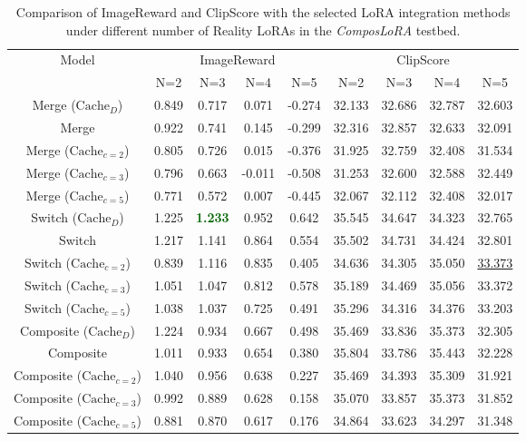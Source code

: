 \begin{table}[H]
\caption{Comparison of ImageReward and ClipScore with the selected LoRA integration methods under different number of Reality LoRAs in the \textit{ComposLoRA} testbed.}
\label{realityirclipfull}
\begin{center}
\begin{tabular}{c|cccc|cccc}
\toprule
\multirow{2}{*}{Model} & \multicolumn{4}{c|}{ImageReward} & \multicolumn{4}{c}{ClipScore} \\
\cmidrule(lr){2-5} \cmidrule(lr){6-9}
& N=2 & N=3 & N=4 & N=5 & N=2 & N=3 & N=4 & N=5 \\
\midrule
Merge ($\text{Cache}_{D}$) & 0.849 & 0.717 & 0.071 & -0.274 & 32.133 & 32.686 & 32.787 & 32.603 \\
Merge & 0.922 & 0.741 & 0.145 & -0.299 & 32.316 & 32.857 & 32.633 & 32.091 \\
Merge ($\text{Cache}_{c=2}$) & 0.805 & 0.726 & 0.015 & -0.376 & 31.925 & 32.759 & 32.408 & 31.534 \\
Merge ($\text{Cache}_{c=3}$) & 0.796 & 0.663 & -0.011 & -0.508 & 31.253 & 32.600 & 32.588 & 32.449 \\
Merge ($\text{Cache}_{c=5}$) & 0.771 & 0.572 & 0.007 & -0.445 & 32.067 & 32.112 & 32.408 & 32.017 \\

Switch ($\text{Cache}_{D}$) & 1.225 & \textcolor{darkgreen}{\textbf{1.233}} & 0.952 & 0.642 & 35.545 & 34.647 & 34.323 & 32.765 \\
Switch & 1.217 & 1.141 & 0.864 & 0.554 & 35.502 & 34.731 & 34.424 & 32.801 \\
Switch ($\text{Cache}_{c=2}$) & 0.839 & 1.116 & 0.835 & 0.405 & 34.636 & 34.305 & 35.050 & \underline{33.373} \\
Switch ($\text{Cache}_{c=3}$) & 1.051 & 1.047 & 0.812 & 0.578 & 35.189 & 34.469 & 35.056 & 33.372 \\
Switch ($\text{Cache}_{c=5}$) & 1.038 & 1.037 & 0.725 & 0.491 & 35.296 & 34.316 & 34.376 & 33.203 \\

Composite ($\text{Cache}_{D}$) & 1.224 & 0.934 & 0.667 & 0.498 & 35.469 & 33.836 & 35.373 & 32.305 \\
Composite & 1.011 & 0.933 & 0.654 & 0.380 & 35.804 & 33.786 & 35.443 & 32.228 \\
Composite ($\text{Cache}_{c=2}$) & 1.040 & 0.956 & 0.638 & 0.227 & 35.469 & 34.393 & 35.309 & 31.921 \\
Composite ($\text{Cache}_{c=3}$) & 0.992 & 0.889 & 0.628 & 0.158 & 35.070 & 33.857 & 35.373 & 31.852 \\
Composite ($\text{Cache}_{c=5}$) & 0.881 & 0.870 & 0.617 & 0.176 & 34.864 & 33.623 & 34.297 & 31.348 \\


\end{tabular}
\end{center}
\end{table}
